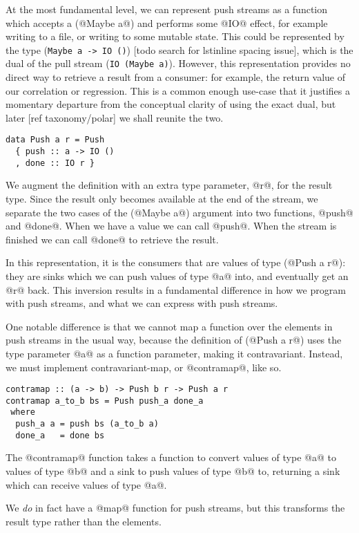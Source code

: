At the most fundamental level, we can represent push streams as a function which accepts a (@Maybe a@) and performs some @IO@ effect, for example writing to a file, or writing to some mutable state.
This could be represented by the type (\lstinline/Maybe a -> IO ()/) [todo search for lstinline spacing issue], which is the dual of the pull stream (\lstinline/IO (Maybe a)/).
However, this representation provides no direct way to retrieve a result from a consumer: for example, the return value of our correlation or regression.
This is a common enough use-case that it justifies a momentary departure from the conceptual clarity of using the exact dual, but later [ref taxonomy/polar] we shall reunite the two.

\begin{lstlisting}
data Push a r = Push
  { push :: a -> IO ()
  , done :: IO r }
\end{lstlisting}

We augment the definition with an extra type parameter, @r@, for the result type.
Since the result only becomes available at the end of the stream, we separate the two cases of the (@Maybe a@) argument into two functions, @push@ and @done@.
When we have a value we can call @push@.
When the stream is finished we can call @done@ to retrieve the result.


In this representation, it is the consumers that are values of type (@Push a r@): they are sinks which we can push values of type @a@ into, and eventually get an @r@ back.
This inversion results in a fundamental difference in how we program with push streams, and what we can express with push streams.

One notable difference is that we cannot map a function over the elements in push streams in the usual way, because the definition of (@Push a r@) uses the type parameter @a@ as a function parameter, making it contravariant.
Instead, we must implement contravariant-map, or @contramap@, like so.

\begin{lstlisting}
contramap :: (a -> b) -> Push b r -> Push a r
contramap a_to_b bs = Push push_a done_a
 where
  push_a a = push bs (a_to_b a)
  done_a   = done bs
\end{lstlisting}

The @contramap@ function takes a function to convert values of type @a@ to values of type @b@ and a sink to push values of type @b@ to, returning a sink which can receive values of type @a@.

We \emph{do} in fact have a @map@ function for push streams, but this transforms the result type rather than the elements.


